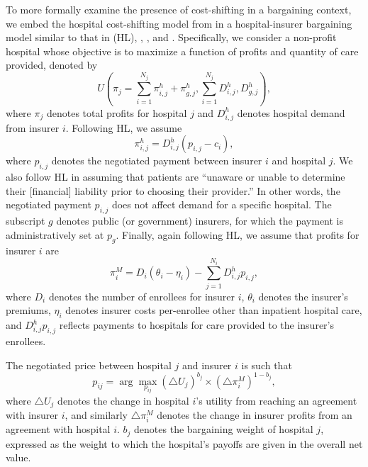 \documentclass[12pt]{article}
\begin{document}
To more formally examine the presence of cost-shifting in a bargaining context, we embed the hospital cost-shifting model from \cite{dranove1988} in a hospital-insurer bargaining model similar to that in \cite{ho2016} (HL), \cite{gowrisankaran2015}, \cite{lewis2015}, and \cite{dor2004}. Specifically, we consider a non-profit hospital whose objective is to maximize a function of profits and quantity of care provided, denoted by
\begin{equation}
 U\left( \pi_{j} = \sum_{i=1}^{N_{j}} \pi_{i,j}^{h} + \pi_{g,j}^{h}, \sum_{i=1}^{N_{j}} D_{i,j}^{h}, D_{g,j}^{h} \right),
\label{eqn:nfp_objective}
\end{equation}
where $\pi_{j}$ denotes total profits for hospital $j$ and $D_{i,j}^{h}$ denotes hospital demand from insurer $i$. Following HL, we assume $$\pi_{i,j}^{h}=D_{i,j}^{h}(p_{i,j}-c_{i}),$$ where $p_{i,j}$ denotes the negotiated payment between insurer $i$ and hospital $j$. We also follow HL in assuming that patients are ``unaware or unable to determine their [financial] liability prior to choosing their provider.'' In other words, the negotiated payment $p_{i,j}$ does not affect demand for a specific hospital. The subscript $g$ denotes public (or government) insurers, for which the payment is administratively set at $p_{g}$. Finally, again following HL, we assume that profits for insurer $i$ are
\begin{equation}
\pi_{i}^{M} = D_{i} \left( \theta_{i} - \eta_{i} \right) - \sum_{j=1}^{N_{i}} D_{i,j}^{h} p_{i,j},
\label{eqn:ins_profit}
\end{equation}
where $D_{i}$ denotes the number of enrollees for insurer $i$, $\theta_{i}$ denotes the insurer's premiums, $\eta_{i}$ denotes insurer costs per-enrollee other than inpatient hospital care, and $D_{i,j}^{h} p_{i,j}$ reflects payments to hospitals for care provided to the insurer's enrollees.

The negotiated price between hospital $j$ and insurer $i$ is such that
\begin{equation}
 p_{ij}= \arg \max_{p_{ij}} \left(\triangle U_{j} \right)^{b_{j}} \times \left(\triangle \pi^{M}_{i} \right)^{1-b_{j}},
 \label{eqn:neg_price}
\end{equation}
where $\triangle U_{j}$ denotes the change in hospital $i$'s utility from reaching an agreement with insurer $i$, and similarly $\triangle \pi^{M}_{i}$ denotes the change in insurer profits from an agreement with hospital $i$. $b_{j}$ denotes the bargaining weight of hospital $j$, expressed as the weight to which the hospital's payoffs are given in the overall net value.
\end{document}

